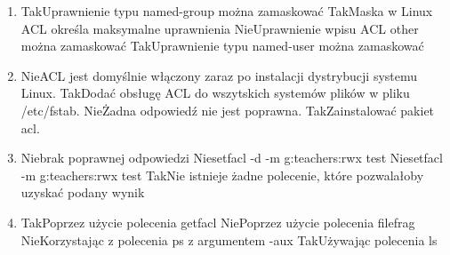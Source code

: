 \begin{enumerate}
	\item {}
	{Tak}{Uprawnienie typu named-group można zamaskować}
	{Tak}{Maska w Linux ACL określa maksymalne uprawnienia}
	{Nie}{Uprawnienie wpisu ACL other można zamaskować}
	{Tak}{Uprawnienie typu named-user można zamaskować}
	
	\item {}
	{Nie}{ACL jest domyślnie włączony zaraz po instalacji dystrybucji systemu Linux.}
	{Tak}{Dodać obsługę ACL do wszytskich systemów plików w pliku /etc/fstab.}
	{Nie}{Żadna odpowiedź nie jest poprawna.}
	{Tak}{Zainstalować pakiet acl.}
	
	\item {}
	{Nie}{brak poprawnej odpowiedzi}
	{Nie}{setfacl -d -m g:teachers:rwx test}
	{Nie}{setfacl -m g:teachers:rwx test}
	{Tak}{Nie istnieje żadne polecenie, które pozwalałoby uzyskać podany wynik}
	
	\newpage
	
	\item {}
	{Tak}{Poprzez użycie polecenia getfacl}
	{Nie}{Poprzez użycie polecenia filefrag}
	{Nie}{Korzystając z polecenia ps z argumentem -aux}
	{Tak}{Używając polecenia ls}
	

\end{enumerate}
